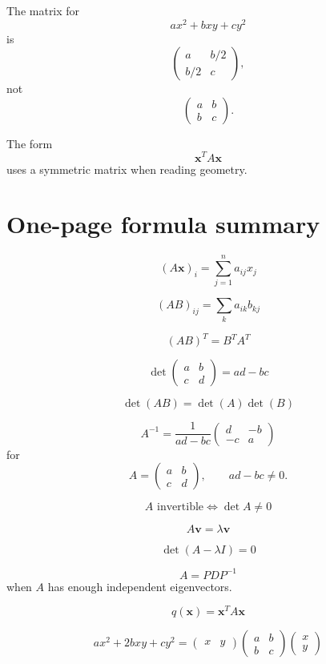 The matrix for
\[
    ax^2+bxy+cy^2
\]
is
\[
    \begin{pmatrix}
    a & b/2\\
    b/2 & c
    \end{pmatrix},
\]
not
\[
    \begin{pmatrix}
    a & b\\
    b & c
    \end{pmatrix}.
\]

The form
\[
    \mathbf x^T A\mathbf x
\]
uses a symmetric matrix when reading geometry.

\section*{One-page formula summary}

\[
\boxed{
    (A\mathbf x)_i
    =
    \sum_{j=1}^n a_{ij}x_j
}
\]

\[
\boxed{
    (AB)_{ij}
    =
    \sum_k a_{ik}b_{kj}
}
\]

\[
\boxed{
    (AB)^T=B^T A^T
}
\]

\[
\boxed{
    \det
    \begin{pmatrix}
    a&b\\
    c&d
    \end{pmatrix}
    =
    ad-bc
}
\]

\[
\boxed{
    \det(AB)=\det(A)\det(B)
}
\]

\[
\boxed{
    A^{-1}
    =
    \frac{1}{ad-bc}
    \begin{pmatrix}
    d&-b\\
    -c&a
    \end{pmatrix}
}
\]
for
\[
    A=
    \begin{pmatrix}
    a&b\\
    c&d
    \end{pmatrix},
    \qquad
    ad-bc\ne0.
\]

\[
\boxed{
    A\text{ invertible}
    \Longleftrightarrow
    \det A\ne0
}
\]

\[
\boxed{
    A\mathbf v=\lambda\mathbf v
}
\]

\[
\boxed{
    \det(A-\lambda I)=0
}
\]

\[
\boxed{
    A=PDP^{-1}
}
\]
when \(A\) has enough independent eigenvectors.

\[
\boxed{
    q(\mathbf x)=\mathbf x^T A\mathbf x
}
\]

\[
\boxed{
    ax^2+2bxy+cy^2
    =
    \begin{pmatrix}x&y\end{pmatrix}
    \begin{pmatrix}
    a&b\\
    b&c
    \end{pmatrix}
    \begin{pmatrix}
    x\\
    y
    \end{pmatrix}
}
\]

